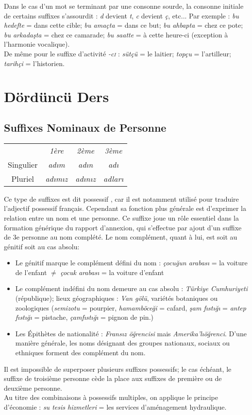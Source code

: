 \documentclass{cours}
\newcommand{\ch}{\c{s}}
\newcommand{\ug}{\u{g}}
\newcommand{\sci}{\textsc{i}}
\begin{document}
Dans le cas d'un mot se terminant par une consonne sourde, la consonne initiale de certains suffixes s'assourdit : {\sl d} devient {\sl t}, {\sl c} devient {\sl ç}, etc...
Par exemple : \textsl{bu hedefte} = dans cette cible; \textsl{bu amaçta} = dans ce but; \textsl{bu ahbapta} = chez ce pote; \textsl{bu arkada\ch ta} = chez ce camarade; \textsl{bu saatte} = à cette heure-ci (exception à l'harmonie vocalique).\\
De même pour le suffixe d'activité \textsl{-c\sci} : \textsl{sütçü} = le laitier; \textsl{topçu} = l'artilleur; \textsl{tarihçi} = l'historien.

\section{Dördüncü Ders}
\subsection{Suffixes Nominaux de Personne}
\begin{center}
    \begin{tabular}{c>{\sl}c>{\sl}c>{\sl}c}
                  & 1ère       & 2ème       & 3ème    \\
        Singulier & ad\i m     & ad\i n     & ad\i    \\
        Pluriel   & ad\i m\i z & ad\i n\i z & adlar\i
    \end{tabular}
\end{center}
Ce type de suffixes est dit \og possessif \fg, car il est notamment utilisé pour traduire l'adjectif possessif français. Cependant sa fonction plus générale est d'exprimer la relation entre un nom et une personne. Ce suffixe joue un rôle essentiel dans la formation générique du rapport d'annexion, qui s'effectue par ajout d'un suffixe de 3e personne au nom complété. Le nom complément, quant à lui, est soit au génitif soit au cas absolu:
\begin{itemize}
    \item Le génitif marque le complément défini du nom : \textsl{çocu\ug un arabas\i} = la voiture de l'enfant $\neq$ \textsl{çocuk arabas\i} = la voiture d'enfant
    \item Le complément indéfini du nom demeure au cas absolu : \textsl{Türkiye Cumhuriyeti} (république); lieux géographiques : \textsl{Van gölü}, variétés botaniques ou zoologiques (\textsl{semizotu} = pourpier, \textsl{hamamböce\ug i} = cafard, \textsl{\ch am f\i st\i \ug \i } = \textsl{antep f\i st\i \ug \i} = pistache, \textsl{çamf\i st\i \ug \i} = pignon de pin.)
    \item Les Épithètes de nationalité : \textsl{Frans\i z ö\ug rencisi} mais \textsl{Amerika'l\i ö\ug renci}. D'une manière générale, les noms désignant des groupes nationaux, sociaux ou ethniques forment des complément du nom.
\end{itemize}
Il est impossible de superposer plusieurs suffixes possessifs; le cas échéant, le suffixe de troisième personne cède la place aux suffixes de première ou de deuxième personne. \\
Au titre des combinaisons à possessifs multiples, on applique le principe d'économie : \textsl{su tesis hizmetleri} = les services d'aménagement hydraulique.
\end{document}
